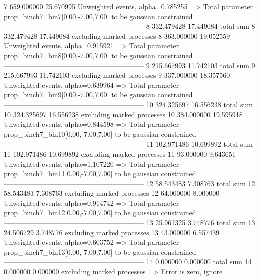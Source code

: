 7          659.000000      25.670995       Unweighted events, alpha=0.785255
  => Total parameter prop_binch7_bin7[0.00,-7.00,7.00] to be gaussian constrained
------------------------------------------------------------
8          332.479428      17.449084       total sum                     
8          332.479428      17.449084       excluding marked processes    
8          363.000000      19.052559       Unweighted events, alpha=0.915921
  => Total parameter prop_binch7_bin8[0.00,-7.00,7.00] to be gaussian constrained
------------------------------------------------------------
9          215.667993      11.742103       total sum                     
9          215.667993      11.742103       excluding marked processes    
9          337.000000      18.357560       Unweighted events, alpha=0.639964
  => Total parameter prop_binch7_bin9[0.00,-7.00,7.00] to be gaussian constrained
------------------------------------------------------------
10         324.325697      16.556238       total sum                     
10         324.325697      16.556238       excluding marked processes    
10         384.000000      19.595918       Unweighted events, alpha=0.844598
  => Total parameter prop_binch7_bin10[0.00,-7.00,7.00] to be gaussian constrained
------------------------------------------------------------
11         102.971486      10.699892       total sum                     
11         102.971486      10.699892       excluding marked processes    
11         93.000000       9.643651        Unweighted events, alpha=1.107220
  => Total parameter prop_binch7_bin11[0.00,-7.00,7.00] to be gaussian constrained
------------------------------------------------------------
12         58.543483       7.308763        total sum                     
12         58.543483       7.308763        excluding marked processes    
12         64.000000       8.000000        Unweighted events, alpha=0.914742
  => Total parameter prop_binch7_bin12[0.00,-7.00,7.00] to be gaussian constrained
------------------------------------------------------------
13         25.961325       3.748776        total sum                     
13         24.506729       3.748776        excluding marked processes    
13         43.000000       6.557439        Unweighted events, alpha=0.603752
  => Total parameter prop_binch7_bin13[0.00,-7.00,7.00] to be gaussian constrained
------------------------------------------------------------
14         0.000000        0.000000        total sum                     
14         0.000000        0.000000        excluding marked processes    
  => Error is zero, ignore      
